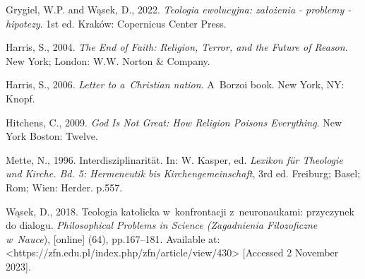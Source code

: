 Grygiel, W.P. and Wąsek, D., 2022. \textit{Teologia ewolucyjna: założenia - problemy - hipotezy}. 1st ed. Kraków: Copernicus Center Press.



Harris, S., 2004. \textit{The End of Faith: Religion, Terror, and the Future of Reason}. New York; London: W.W. Norton \& Company.



Harris, S., 2006. \textit{Letter to a~Christian nation}. A~Borzoi book. New York, NY: Knopf.



Hitchens, C., 2009. \textit{God Is Not Great: How Religion Poisons Everything}. New York Boston: Twelve.



Mette, N., 1996. Interdisziplinarität. In: W. Kasper, ed. \textit{Lexikon für Theologie und Kirche. Bd. 5: Hermeneutik bis Kirchengemeinschaft}, 3rd ed. Freiburg; Basel; Rom; Wien: Herder. p.557.



Wąsek, D., 2018. Teologia katolicka w~konfrontacji z~neuronaukami: przyczynek do dialogu. \textit{Philosophical Problems in Science (Zagadnienia Filozoficzne w~Nauce}), [online] (64), pp.167–181. Available at: {\textless}https://zfn.edu.pl/index.php/zfn/article/view/430{\textgreater} [Accessed 2 November 2023].




